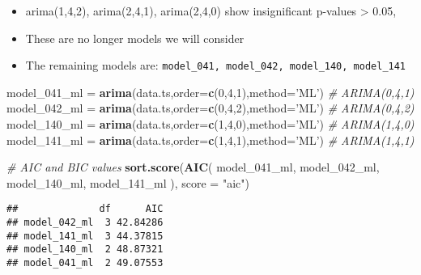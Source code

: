 \documentclass[]{article}
\newenvironment{Shaded}{\begin{snugshade}}{\end{snugshade}}
\newcommand{\CommentTok}[1]{\textcolor[rgb]{0.56,0.35,0.01}{\textit{#1}}}
\newcommand{\DataTypeTok}[1]{\textcolor[rgb]{0.13,0.29,0.53}{#1}}
\newcommand{\DecValTok}[1]{\textcolor[rgb]{0.00,0.00,0.81}{#1}}
\newcommand{\KeywordTok}[1]{\textcolor[rgb]{0.13,0.29,0.53}{\textbf{#1}}}
\newcommand{\NormalTok}[1]{#1}
\newcommand{\StringTok}[1]{\textcolor[rgb]{0.31,0.60,0.02}{#1}}
\providecommand{\tightlist}{%
  \setlength{\itemsep}{0pt}\setlength{\parskip}{0pt}}
\begin{document}
\begin{itemize}
\tightlist
\item
  arima(1,4,2), arima(2,4,1), arima(2,4,0) show insignificant p-values
  \textgreater{} 0.05,
\item
  These are no longer models we will consider
\item
  The remaining models are:
  \texttt{model\_041,\ model\_042,\ model\_140,\ model\_141}
\end{itemize}

\begin{Shaded}
\begin{Highlighting}[]
\NormalTok{model_}\DecValTok{041}\NormalTok{_ml =}\StringTok{ }\KeywordTok{arima}\NormalTok{(data.ts,}\DataTypeTok{order=}\KeywordTok{c}\NormalTok{(}\DecValTok{0}\NormalTok{,}\DecValTok{4}\NormalTok{,}\DecValTok{1}\NormalTok{),}\DataTypeTok{method=}\StringTok{'ML'}\NormalTok{) }\CommentTok{# ARIMA(0,4,1)}
\NormalTok{model_}\DecValTok{042}\NormalTok{_ml =}\StringTok{ }\KeywordTok{arima}\NormalTok{(data.ts,}\DataTypeTok{order=}\KeywordTok{c}\NormalTok{(}\DecValTok{0}\NormalTok{,}\DecValTok{4}\NormalTok{,}\DecValTok{2}\NormalTok{),}\DataTypeTok{method=}\StringTok{'ML'}\NormalTok{) }\CommentTok{# ARIMA(0,4,2)}
\NormalTok{model_}\DecValTok{140}\NormalTok{_ml =}\StringTok{ }\KeywordTok{arima}\NormalTok{(data.ts,}\DataTypeTok{order=}\KeywordTok{c}\NormalTok{(}\DecValTok{1}\NormalTok{,}\DecValTok{4}\NormalTok{,}\DecValTok{0}\NormalTok{),}\DataTypeTok{method=}\StringTok{'ML'}\NormalTok{) }\CommentTok{# ARIMA(1,4,0)}
\NormalTok{model_}\DecValTok{141}\NormalTok{_ml =}\StringTok{ }\KeywordTok{arima}\NormalTok{(data.ts,}\DataTypeTok{order=}\KeywordTok{c}\NormalTok{(}\DecValTok{1}\NormalTok{,}\DecValTok{4}\NormalTok{,}\DecValTok{1}\NormalTok{),}\DataTypeTok{method=}\StringTok{'ML'}\NormalTok{) }\CommentTok{# ARIMA(1,4,1)}

\CommentTok{# AIC and BIC values}
\KeywordTok{sort.score}\NormalTok{(}\KeywordTok{AIC}\NormalTok{(}
\NormalTok{  model_}\DecValTok{041}\NormalTok{_ml, model_}\DecValTok{042}\NormalTok{_ml, model_}\DecValTok{140}\NormalTok{_ml, model_}\DecValTok{141}\NormalTok{_ml ),}
  \DataTypeTok{score =} \StringTok{"aic"}\NormalTok{)}
\end{Highlighting}
\end{Shaded}

\begin{verbatim}
##              df      AIC
## model_042_ml  3 42.84286
## model_141_ml  3 44.37815
## model_140_ml  2 48.87321
## model_041_ml  2 49.07553
\end{verbatim}
\end{document}
